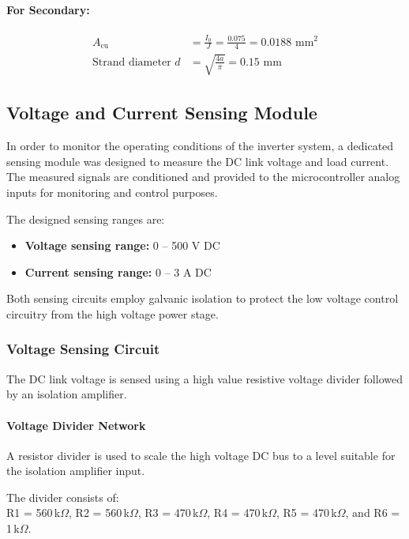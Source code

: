 \paragraph{For Secondary:}
\begin{align*}
    A_{\text{cu}} &= \frac{I_0}{J} = \frac{0.075}{4} = 0.0188 \text{ mm}^2 \\
    \text{Strand diameter } d &= \sqrt{\frac{4a}{\pi}} = 0.15 \text{ mm}
\end{align*}

\subsection{Voltage and Current Sensing Module}

In order to monitor the operating conditions of the inverter system, a dedicated sensing module was designed to measure the DC link voltage and load current. The measured signals are conditioned and provided to the microcontroller analog inputs for monitoring and control purposes.

The designed sensing ranges are:

\begin{itemize}
\item \textbf{Voltage sensing range:} 0 -- 500 V DC
\item \textbf{Current sensing range:} 0 -- 3 A DC
\end{itemize}

Both sensing circuits employ galvanic isolation to protect the low voltage control circuitry from the high voltage power stage.

\subsubsection{Voltage Sensing Circuit}

The DC link voltage is sensed using a high value resistive voltage divider followed by an isolation amplifier.

\paragraph{Voltage Divider Network}

A resistor divider is used to scale the high voltage DC bus to a level suitable for the isolation amplifier input.

The divider consists of:\\
R1 = 560\,k$\Omega$, R2 = 560\,k$\Omega$, R3 = 470\,k$\Omega$, R4 = 470\,k$\Omega$, R5 = 470\,k$\Omega$, and R6 = 1\,k$\Omega$. \\

